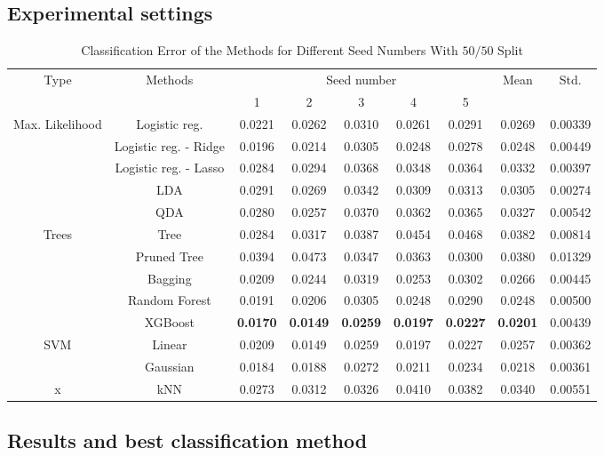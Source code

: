 \subsection{Experimental settings}
\begin{table}[htb]
	\caption{Classification Error of the Methods for Different Seed Numbers With $50/50$ Split}
	\begin{center}
		\begin{tabular}{@{} c c c  c c c c c c@{}}\toprule
			\multirow{2}{*}{Type} & \multirow{2}{*}{Methods} &  \multicolumn{5}{c}{Seed number}
			& 	\multirow{2}{*}{Mean} & \multirow{2}{*}{Std.} \\
			& & 1 & 2 & 3 & 4 & 5 & & \\
			\midrule
			\multirow{5}{*}{Max. Likelihood} & Logistic reg. & \num{0.0221} & \num{0.0262} & \num{0.0310} & \num{0.0261} & \num{0.0291} & \num{0.0269} & \num{0.00339} \\
			& Logistic reg. - Ridge & \num{0.0196} & \num{0.0214} & \num{0.0305} & \num{0.0248} & \num{0.0278} & \num{0.0248} & \num{0.00449}\\
			& Logistic reg. - Lasso & \num{0.0284} & \num{0.0294} & \num{0.0368} & \num{0.0348} & \num{0.0364} & \num{0.0332} & \num{0.00397}\\
			& LDA & \num{0.0291} & \num{0.0269} & \num{0.0342} & \num{0.0309} & \num{0.0313} & \num{0.0305} & \num{0.00274}\\
			& QDA & \num{0.0280} & \num{0.0257} & \num{0.0370} & \num{0.0362} & \num{0.0365} & \num{0.0327} & \num{0.00542}\\
			\cmidrule{1-9}
			\multirow{5}{*}{Trees} & Tree & \num{0.0284} & \num{0.0317} & \num{0.0387} & \num{0.0454} & \num{0.0468} & \num{0.0382} & \num{0.00814}\\
			& Pruned Tree & \num{0.0394} & \num{0.0473} & \num{0.0347} & \num{0.0363} & \num{0.0300} & \num{0.0380} & \num{0.01329}\\  
			& Bagging & \num{0.0209} & \num{0.0244} & \num{0.0319} & \num{0.0253} & \num{0.0302} & \num{0.0266} & \num{0.00445}\\
			& Random Forest & \num{0.0191} & \num{0.0206} & \num{0.0305} & \num{0.0248} & \num{0.0290} & \num{0.0248} & \num{0.00500}\\
			& XGBoost & \textbf{\num{0.0170}} & \textbf{\num{0.0149}} & \textbf{\num{0.0259}} & \textbf{\num{0.0197}} & \textbf{\num{0.0227}} & \textbf{\num{0.0201}} & \num{0.00439}\\
			\cmidrule{1-9}
			\multirow{2}{*}{SVM} & Linear & \num{0.0209} & \num{0.0149} & \num{0.0259} & \num{0.0197} & \num{0.0227} & \num{0.0257} & \num{0.00362}\\
			& Gaussian & \num{0.0184} & \num{0.0188} & \num{0.0272} & \num{0.0211} & \num{0.0234} & \num{0.0218} & \num{0.00361}\\
			\cmidrule{1-9}
			x & kNN & \num{0.0273} & \num{0.0312} & \num{0.0326} & \num{0.0410} & \num{0.0382} & \num{0.0340} & \num{0.00551} \\
			\bottomrule
		\end{tabular}
	\end{center}
	\label{tab_res_our_strategy}
\end{table}

\subsection{Results and best classification method}